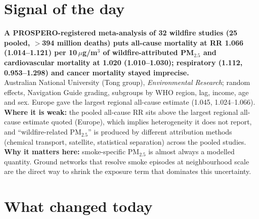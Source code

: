 \documentclass[10pt]{article}
\begin{document}
\vspace{6mm}

\section*{\sffamily\bfseries\color{Deep}Signal of the day}
\vspace{-1.5mm}{\color{Amber}\rule{\linewidth}{1.1pt}}\vspace{2.5mm}

\begin{keybox}
{\sffamily\bfseries\small\color{Deep}A PROSPERO-registered meta-analysis of 32 wildfire studies (25 pooled, $>$394 million deaths) puts all-cause mortality at RR 1.066 (1.014--1.121) per 10\,$\mu$g/m$^3$ of wildfire-attributed PM$_{2.5}$ and cardiovascular mortality at 1.020 (1.010--1.030); respiratory (1.112, 0.953--1.298) and cancer mortality stayed imprecise.}\\[1.4mm]
\footnotesize
Australian National University (Tong group), \textit{Environmental Research}; random effects, Navigation Guide grading, subgroups by WHO region, lag, income, age and sex. Europe gave the largest regional all-cause estimate (1.045, 1.024--1.066).
\textbf{Where it is weak:} the pooled all-cause RR sits above the largest regional all-cause estimate quoted (Europe), which implies heterogeneity it does not report, and ``wildfire-related PM$_{2.5}$'' is produced by different attribution methods (chemical transport, satellite, statistical separation) across the pooled studies.
\textbf{Why it matters here:} smoke-specific PM$_{2.5}$ is almost always a modelled quantity. Ground networks that resolve smoke episodes at neighbourhood scale are the direct way to shrink the exposure term that dominates this uncertainty.\par
\end{keybox}

\vspace{3mm}

\section*{\sffamily\bfseries\color{Deep}What changed today}
\vspace{-1.5mm}{\color{Amber}\rule{\linewidth}{1.1pt}}\vspace{2.5mm}
\end{document}
